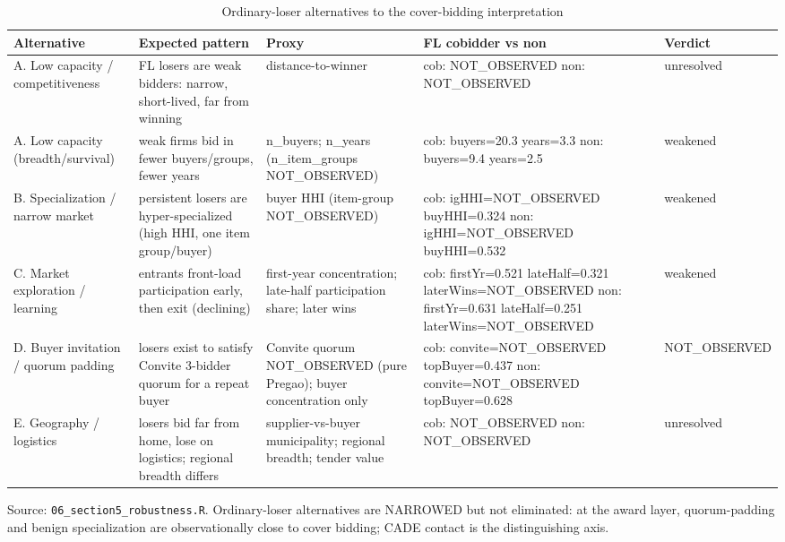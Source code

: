 \begin{table}[htbp]\centering\footnotesize
\caption{Ordinary-loser alternatives to the cover-bidding interpretation}
\label{tab:ordinary_loser_alternatives}
\begin{tabular}{p{2.4cm}p{2.4cm}p{2.4cm}p{2.4cm}p{1.4cm}}\hline
Alternative & Expected pattern & Proxy & FL cobidder vs non & Verdict \\\hline
A. Low capacity / competitiveness & FL losers are weak bidders: narrow, short-lived, far from winning & distance-to-winner & cob: NOT\_OBSERVED \newline non: NOT\_OBSERVED & unresolved \\
A. Low capacity (breadth/survival) & weak firms bid in fewer buyers/groups, fewer years & n\_buyers; n\_years (n\_item\_groups NOT\_OBSERVED) & cob: buyers=20.3 years=3.3 \newline non: buyers=9.4 years=2.5 & weakened \\
B. Specialization / narrow market & persistent losers are hyper-specialized (high HHI, one item group/buyer) & buyer HHI (item-group NOT\_OBSERVED) & cob: igHHI=NOT\_OBSERVED buyHHI=0.324 \newline non: igHHI=NOT\_OBSERVED buyHHI=0.532 & weakened \\
C. Market exploration / learning & entrants front-load participation early, then exit (declining) & first-year concentration; late-half participation share; later wins & cob: firstYr=0.521 lateHalf=0.321 laterWins=NOT\_OBSERVED \newline non: firstYr=0.631 lateHalf=0.251 laterWins=NOT\_OBSERVED & weakened \\
D. Buyer invitation / quorum padding & losers exist to satisfy Convite 3-bidder quorum for a repeat buyer & Convite quorum NOT\_OBSERVED (pure Pregao); buyer concentration only & cob: convite=NOT\_OBSERVED topBuyer=0.437 \newline non: convite=NOT\_OBSERVED topBuyer=0.628 & NOT\_OBSERVED \\
E. Geography / logistics & losers bid far from home, lose on logistics; regional breadth differs & supplier-vs-buyer municipality; regional breadth; tender value & cob: NOT\_OBSERVED \newline non: NOT\_OBSERVED & unresolved \\
\hline\end{tabular}
\begin{tablenotes}\footnotesize\item Source: \texttt{06\_section5\_robustness.R}. 
Ordinary-loser alternatives are NARROWED but not eliminated: at the award layer, quorum-padding 
and benign specialization are observationally close to cover bidding; CADE contact is the distinguishing axis.
\end{tablenotes}\end{table}
